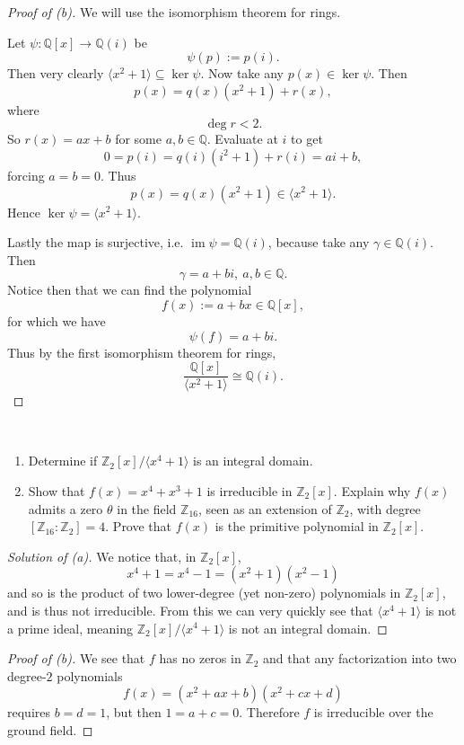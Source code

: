 \begin{proof}[Proof of (b)]
    We will use the isomorphism theorem for rings. 

    Let $\psi : \mathbb Q[x] \to \mathbb Q(i)$ be 
    \[
        \psi(p) := p(i).
    \]
    Then very clearly $\langle x^2 + 1\rangle \subseteq 
    \ker \psi$. Now take any $p(x) \in \ker \psi$. 
    Then 
    \[
        p(x) = q(x)(x^2 + 1) + r(x),
    \]
    where 
    \[
        \deg r < 2.
    \]
    So $r(x) = ax + b$ for some $a,b \in \mathbb Q$. 
    Evaluate at $i$ to get 
    \[
        0 = p(i) = q(i)(i^2 + 1) + r(i) = ai + b,
    \]
    forcing $a = b = 0$. Thus 
    \[
        p(x) = q(x)(x^2 + 1) \in \langle x^2 + 1 \rangle.
    \]
    Hence $\ker \psi = \langle x^2 + 1 \rangle$.

    Lastly the map is surjective, i.e. $\operatorname{im} \psi = 
    \mathbb Q(i)$, 
    because take any $\gamma \in \mathbb Q(i)$. Then 
    \[
        \gamma = a + bi, \ a,b \in \mathbb Q.
    \]
    Notice then that we can find the polynomial 
    \[
        f(x) := a + bx \in \mathbb Q[x], 
    \]
    for which we have 
    \[
        \psi(f) = a + bi. 
    \]
    Thus by the first isomorphism theorem for rings, 
    \[
        \frac{\mathbb Q[x]}{\langle x^2 + 1\rangle} 
        \cong \mathbb Q(i).
    \]
\end{proof}

\begin{prob}
    \ 
    \medskip

    \begin{enumerate}[label=\alph*)]
        \item Determine if $\mathbb Z_2[x]/\langle x^4 + 1 \rangle$ 
            is an integral domain.
        \item Show that $f(x) = x^4 + x^3 + 1$ is 
            irreducible in $\mathbb Z_2[x]$. Explain why 
            $f(x)$ admits a zero $\theta$ in the field 
            $\mathbb Z_{16}$, seen as an extension of 
            $\mathbb Z_2$, with degree 
            $[\mathbb Z_{16} : \mathbb Z_2] = 4$. Prove that 
            $f(x)$ is the primitive polynomial in $\mathbb Z_2[x]$.
    \end{enumerate}
\end{prob}
\begin{proof}[Solution of (a)]
    We notice that, in $\mathbb Z_2[x]$, 
    \[
        x^4 + 1 = x^4 - 1 = (x^2 + 1)(x^2 - 1)
    \]
    and so is the product of two lower-degree (yet non-zero) 
    polynomials in $\mathbb Z_2[x]$, and is thus not 
    irreducible. From this we can very quickly 
    see that $\langle x^4 + 1 \rangle$ is not a 
    prime ideal, meaning $\mathbb Z_2[x]/\langle x^4 + 1 \rangle$
    is not an integral domain.
\end{proof}
\begin{proof}[Proof of (b)]
    We see that $f$ has no zeros in $\mathbb Z_2$ and that 
    any factorization into two 
    degree-$2$ polynomials 
    \[
        f(x) = (x^2 + ax + b)(x^2 + cx + d)
    \]
    requires $b=d=1$, but then $1 = a+c = 0$.
    Therefore $f$ is irreducible over the ground field.
\end{proof}

